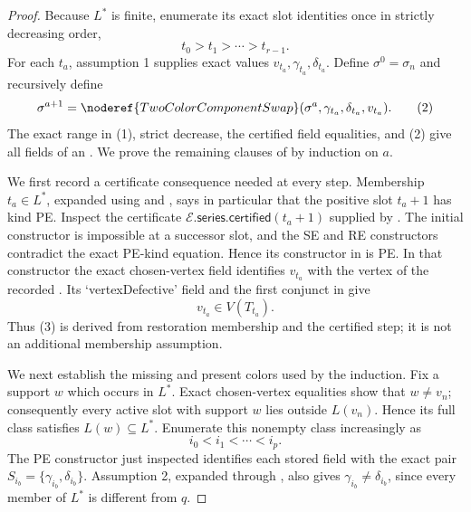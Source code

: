 \begin{proof}
Because \(L^*\) is finite, enumerate its exact slot identities once in
strictly decreasing order,
\[
                         t_0>t_1>\cdots>t_{r-1}.               \tag{1}
\]
For each \(t_a\), assumption 1 supplies exact values
\(v_{t_a},\gamma_{t_a},\delta_{t_a}\).  Define \(\sigma^0=\sigma_n\)
and recursively define
\[
 \sigma^{a+1}=\noderef{TwoColorComponentSwap}
   (\sigma^a,\gamma_{t_a},\delta_{t_a},v_{t_a}).                \tag{2}
\]
The exact range in (1), strict decrease, the certified field equalities,
and (2) give all fields of an
.  We prove the remaining clauses
of  by induction on \(a\).

We first record a certificate consequence needed at every step.  Membership
\(t_a\in L^*\), expanded using
 and
, says in particular that the positive
slot \(t_a+1\) has kind PE.  Inspect the certificate
\(\mathcal E.\mathsf{series}.\mathsf{certified}(t_a+1)\) supplied by
.  The initial constructor is impossible at a
successor slot, and the SE and RE constructors contradict the exact PE-kind
equation.  Hence its constructor in  is PE.
In that constructor the exact chosen-vertex field identifies \(v_{t_a}\)
with the vertex of the recorded
.  Its `vertexDefective' field and the
first conjunct in  give
\[
             v_{t_a}\in V(T_{t_a}).                            \tag{3}
\]
Thus (3) is derived from restoration membership and the certified step;
it is not an additional membership assumption.

We next establish the missing and present colors used by the induction.
Fix a support \(w\) which occurs in \(L^*\).  Exact chosen-vertex
equalities show that \(w\ne v_n\); consequently every active slot with
support \(w\) lies outside \(L(v_n)\).  Hence its full class satisfies
\(L(w)\subseteq L^*\).  Enumerate this nonempty class increasingly as
\[
                         i_0<i_1<\cdots<i_p.                    \tag{4}
\]
The PE constructor just inspected identifies each stored field with the
exact pair \(S_{i_b}=\{\gamma_{i_b},\delta_{i_b}\}\).  Assumption 2,
expanded through , also gives
\(\gamma_{i_b}\ne\delta_{i_b}\), since every member of \(L^*\) is
different from \(q\).


\end{proof}

